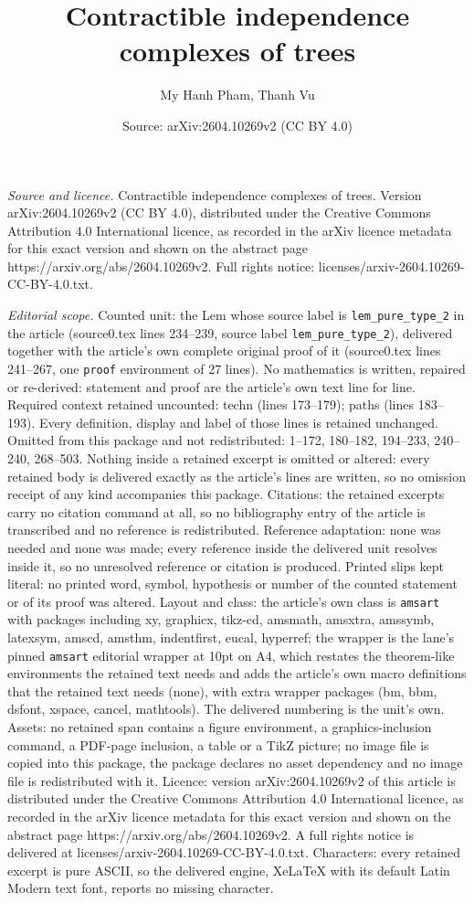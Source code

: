 \documentclass[10pt,a4paper]{amsart}
\title[Contractible independence complexes of trees]{Contractible independence complexes of trees}
\author{My Hanh Pham, Thanh Vu}
\date{Source: arXiv:2604.10269v2 (CC BY 4.0)}
\begin{document}
\maketitle

\noindent\emph{Source and licence.} Contractible independence complexes of trees. Version arXiv:2604.10269v2 (CC BY 4.0), distributed under the Creative Commons Attribution 4.0 International licence, as recorded in the arXiv licence metadata for this exact version and shown on the abstract page https://arxiv.org/abs/2604.10269v2. Full rights notice: licenses/arxiv-2604.10269-CC-BY-4.0.txt.\par\smallskip

\noindent\textit{Editorial scope.} Counted unit: the Lem whose source label is \texttt{lem\_pure\_type\_2} in the article (source0.tex lines 234--239, source label \texttt{lem\_pure\_type\_2}), delivered together with the article's own complete original proof of it (source0.tex lines 241--267, one \texttt{proof} environment of 27 lines). No mathematics is written, repaired or re-derived: statement and proof are the article's own text line for line. Required context retained uncounted: techn (lines 173--179); paths (lines 183--193). Every definition, display and label of those lines is retained unchanged. Omitted from this package and not redistributed: 1--172, 180--182, 194--233, 240--240, 268--503. Nothing inside a retained excerpt is omitted or altered: every retained body is delivered exactly as the article's lines are written, so no omission receipt of any kind accompanies this package. Citations: the retained excerpts carry no citation command at all, so no bibliography entry of the article is transcribed and no reference is redistributed. Reference adaptation: none was needed and none was made; every reference inside the delivered unit resolves inside it, so no unresolved reference or citation is produced. Printed slips kept literal: no printed word, symbol, hypothesis or number of the counted statement or of its proof was altered. Layout and class: the article's own class is \texttt{amsart} with packages including xy, graphicx, tikz-cd, amsmath, amsxtra, amssymb, latexsym, amscd, amsthm, indentfirst, eucal, hyperref; the wrapper is the lane's pinned \texttt{amsart} editorial wrapper at 10pt on A4, which restates the theorem-like environments the retained text needs and adds the article's own macro definitions that the retained text needs (none), with extra wrapper packages (bm, bbm, dsfont, xspace, cancel, mathtools). The delivered numbering is the unit's own. Assets: no retained span contains a figure environment, a graphics-inclusion command, a PDF-page inclusion, a table or a TikZ picture; no image file is copied into this package, the package declares no asset dependency and no image file is redistributed with it. Licence: version arXiv:2604.10269v2 of this article is distributed under the Creative Commons Attribution 4.0 International licence, as recorded in the arXiv licence metadata for this exact version and shown on the abstract page https://arxiv.org/abs/2604.10269v2. A full rights notice is delivered at licenses/arxiv-2604.10269-CC-BY-4.0.txt. Characters: every retained excerpt is pure ASCII, so the delivered engine, XeLaTeX with its default Latin Modern text font, reports no missing character.
\end{document}
